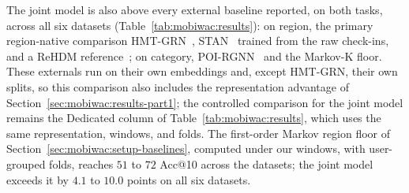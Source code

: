 The joint model is also above every external baseline reported, on both tasks,
across all six datasets (Table~\ref{tab:mobiwac:results}): on region, the primary
region-native comparison HMT-GRN~\cite{Lim2022}, STAN~\cite{luo2021stan}
trained from the raw check-ins, and a ReHDM reference~\cite{li2025rehdm}; on
category, POI-RGNN~\cite{capanema2023poirgnn} and the Markov-K floor. These externals run on their own embeddings and, except HMT-GRN, their own splits, so this
comparison also includes the representation advantage of Section~\ref{sec:mobiwac:results-part1}; the
controlled comparison for the joint model remains the Dedicated column of
Table~\ref{tab:mobiwac:results}, which uses the same representation, windows, and
folds. The first-order Markov region floor of Section~\ref{sec:mobiwac:setup-baselines},
computed under our windows, with user-grouped folds, reaches $51$ to $72$ Acc@10 across the
datasets; the joint model exceeds it by $4.1$ to $10.0$ points on all six
datasets.

